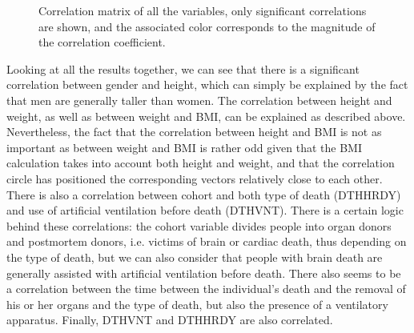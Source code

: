 \documentclass[a4paper, 11pt]{article}
\begin{document}
\begin{multicols}{2}
\begin{figure}[H]
	\caption{Correlation matrix of all the variables, only significant correlations are shown, and the associated color corresponds to the magnitude of the correlation coefficient.}
	\label{fig:allCor}
\end{figure}
Looking at all the results together, we can see that there is a significant correlation between gender and height, which can simply be explained by the fact that men are generally taller than women. 
The correlation between height and weight, as well as between weight and BMI, can be explained as described above. 
Nevertheless, the fact that the correlation between height and BMI is not as important as between weight and BMI is rather odd given that the BMI calculation takes into account both height and weight, and that the correlation circle has positioned the corresponding vectors relatively close to each other. 
There is also a correlation between cohort and both type of death (DTHHRDY) and use of artificial ventilation before death (DTHVNT). 
There is a certain logic behind these correlations: the cohort variable divides people into organ donors and postmortem donors, i.e. victims of brain or cardiac death, thus depending on the type of death, but we can also consider that people with brain death are generally assisted with artificial ventilation before death. 
There also seems to be a correlation between the time between the individual's death and the removal of his or her organs and the type of death, but also the presence of a ventilatory apparatus. 
Finally, DTHVNT and DTHHRDY are also correlated.
\begin{table}[h]
\footnotesize
{}
\end{table}
\end{multicols}
\end{document}
